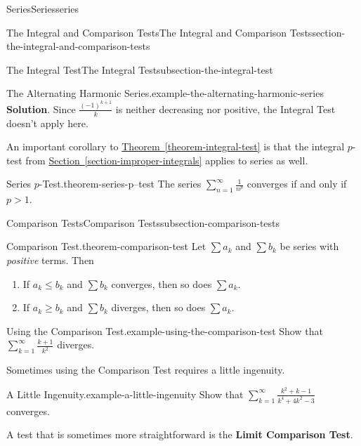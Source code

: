 \documentclass[oneside,10pt,]{book}
\newcommand{\terminology}[1]{\textbf{#1}}
\numberwithin{equation}{section}
\newcommand{\gt}{>}
\begin{document}
\begin{chapterptx}{Series}{}{Series}{}{}{series}
\begin{sectionptx}{The Integral and Comparison Tests}{}{The Integral and Comparison Tests}{}{}{section-the-integral-and-comparison-tests}
\begin{subsectionptx}{The Integral Test}{}{The Integral Test}{}{}{subsection-the-integral-test}
\begin{example}{The Alternating Harmonic Series.}{example-the-alternating-harmonic-series}
\noindent\textbf{Solution}.\hypertarget{solution-182}{}\quad%
\hypertarget{p-878}{}%
Since \(\frac{(-1)^{k+1}}{k}\) is neither decreasing nor positive, the Integral Test doesn't apply here.%
\end{example}
\hypertarget{p-879}{}%
An important corollary to \hyperref[theorem-integral-test]{Theorem~\ref{theorem-integral-test}} is that the integral \(p\)-test from \hyperref[section-improper-integrals]{Section~\ref{section-improper-integrals}} applies to series as well.%
\begin{theorem}{Series \(p\)-Test.}{}{theorem-series-p--test}%
\hypertarget{p-880}{}%
The series \(\sum_{n=1}^{\infty}\frac{1}{n^{p}}\) converges if and only if \(p \gt 1\).%
\end{theorem}
\end{subsectionptx}
%
%
\typeout{************************************************}
\typeout{************************************************}
%
\begin{subsectionptx}{Comparison Tests}{}{Comparison Tests}{}{}{subsection-comparison-tests}
\begin{theorem}{Comparison Test.}{}{theorem-comparison-test}%
\hypertarget{p-881}{}%
Let \(\sum a_{k}\) and \(\sum b_{k}\) be series with \emph{positive} terms. Then\leavevmode%
\begin{enumerate}
\item\hypertarget{li-94}{}\hypertarget{p-882}{}%
If \(a_{k}\leq b_{k}\) and \(\sum b_{k}\) converges, then so does \(\sum a_{k}\).%
\item\hypertarget{li-95}{}\hypertarget{p-883}{}%
If \(a_{k} \geq b_{k}\) and \(\sum b_{k}\) diverges, then so does \(\sum a_{k}\).%
\end{enumerate}
%
\end{theorem}
\begin{example}{Using the Comparison Test.}{example-using-the-comparison-test}%
\hypertarget{p-884}{}%
Show that \(\sum_{k=1}^{\infty}\frac{k + 1}{k^{2}}\) diverges.%
\end{example}
\hypertarget{p-885}{}%
Sometimes using the Comparison Test requires a little ingenuity.%
\begin{example}{A Little Ingenuity.}{example-a-little-ingenuity}%
\hypertarget{p-886}{}%
Show that \(\sum_{k=1}^{\infty}\frac{k^{2} + k - 1}{k^{4} + 4k^{2} - 3}\) converges.%
\end{example}
\hypertarget{p-887}{}%
A test that is sometimes more straightforward is the \terminology{Limit Comparison Test}.%

\end{subsectionptx}
\end{sectionptx}
\end{chapterptx}
\end{document}
